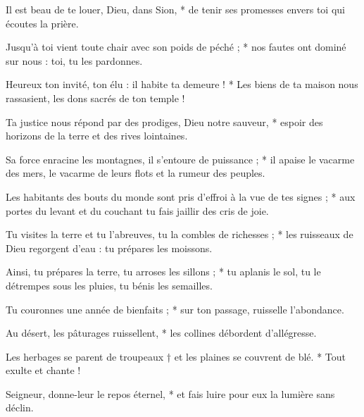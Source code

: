 \item Il est beau de te louer, Dieu, dans Sion, * de tenir ses promesses envers toi qui écoutes la prière.

\item Jusqu'à toi vient toute chair avec son poids de péché ; * nos fautes ont dominé sur nous : toi, tu les pardonnes.

\item Heureux ton invité, ton élu : il habite ta demeure ! * Les biens de ta maison nous rassasient, les dons sacrés de ton temple !

\item Ta justice nous répond par des prodiges, Dieu notre sauveur, * espoir des horizons de la terre et des rives lointaines.

\item Sa force enracine les montagnes, il s'entoure de puissance ; * il apaise le vacarme des mers, le vacarme de leurs flots et la rumeur des peuples.

\item Les habitants des bouts du monde sont pris d'effroi à la vue de tes signes ; * aux portes du levant et du couchant tu fais jaillir des cris de joie.

\item Tu visites la terre et tu l'abreuves, tu la combles de richesses ; * les ruisseaux de Dieu regorgent d'eau : tu prépares les moissons. 

\item Ainsi, tu prépares la terre, tu arroses les sillons ; * tu aplanis le sol, tu le détrempes sous les pluies, tu bénis les semailles.

\item Tu couronnes une année de bienfaits ; * sur ton passage, ruisselle l'abondance.

\item Au désert, les pâturages ruissellent, * les collines débordent d'allégresse.

\item Les herbages se parent de troupeaux † et les plaines se couvrent de blé. * Tout exulte et chante !

\item Seigneur, donne-leur le repos éternel, * et fais luire pour eux la lumière sans déclin.